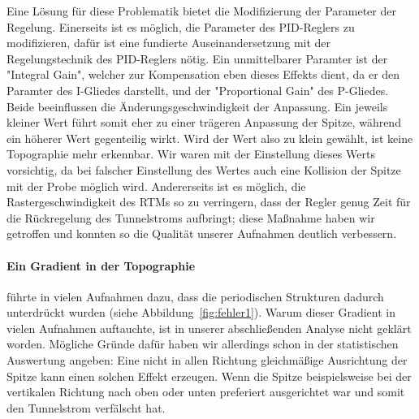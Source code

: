 Eine Lösung für diese Problematik bietet die Modifizierung der Parameter der Regelung. 
Einerseits ist es möglich, die Parameter des PID-Reglers zu modifizieren, dafür
ist eine fundierte Auseinandersetzung mit der Regelungstechnik des PID-Reglers nötig.
Ein unmittelbarer Paramter ist der "Integral Gain", welcher zur Kompensation eben dieses
Effekts dient, da er den Paramter des I-Gliedes darstellt,
und der "Proportional Gain" des P-Gliedes. Beide beeinflussen die Änderungsgeschwindigkeit
der Anpassung. Ein jeweils kleiner Wert führt somit eher zu einer trägeren Anpassung
der Spitze, während ein höherer Wert gegenteilig wirkt. Wird der Wert also zu klein gewählt,
ist keine Topographie mehr erkennbar. Wir waren mit der Einstellung dieses Werts vorsichtig,
da bei falscher Einstellung des Wertes auch eine Kollision der Spitze mit der Probe möglich wird.
Andererseits ist es möglich, die Rastergeschwindigkeit des RTMs so zu verringern, dass der
Regler genug Zeit für die Rückregelung des Tunnelstroms aufbringt; diese Maßnahme haben wir 
getroffen und konnten so die Qualität unserer Aufnahmen deutlich verbessern.
\paragraph{Ein Gradient in der Topographie} führte in vielen Aufnahmen
dazu, dass die periodischen Strukturen dadurch unterdrückt wurden (siehe Abbildung~\ref{fig:fehler1}).
Warum dieser Gradient in vielen Aufnahmen auftauchte, ist in unserer abschließenden Analyse
nicht geklärt worden. Mögliche Gründe dafür haben wir allerdings schon in der statistischen Auswertung
angeben: Eine nicht in allen Richtung gleichmäßige Ausrichtung der Spitze kann einen solchen
Effekt erzeugen. Wenn die Spitze beispielsweise 
bei der vertikalen Richtung nach oben oder unten preferiert ausgerichtet
war und somit den Tunnelstrom verfälscht hat.
